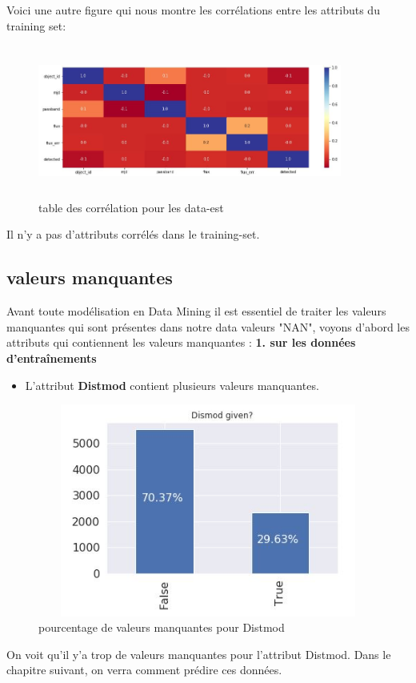 \newline Voici une autre figure qui nous montre les corrélations entre les attributs du training set:
\begin{figure}[!h]
    \centering
    \includegraphics[width=10cm,height=5cm]{report/figures/correlation1.jpg}
    \caption{table des corrélation pour les data-est}
    \label{fig:my_label}
\end{figure}
Il n'y a pas d'attributs corrélés dans le training-set.



\newpage
\subsection{valeurs manquantes}
Avant toute modélisation en Data Mining il est essentiel de traiter les valeurs manquantes qui sont présentes dans notre data valeurs "NAN", voyons d'abord les attributs qui contiennent les valeurs manquantes :
\newline
\textbf{1. sur les données d'entraînements}
\newline
\begin{itemize}
    \item L'attribut \textbf{Distmod} contient plusieurs valeurs manquantes. 
\end{itemize}

\begin{figure}[!h]
    \centering
    \includegraphics[width=12cm,height=7cm]{report/figures/distmod.jpg}
    \caption{pourcentage de valeurs manquantes pour Distmod}
    \label{fig:my_label}
\end{figure}
On voit qu'il y'a trop de valeurs manquantes pour l'attribut Distmod. Dans le chapitre suivant, on verra comment prédire ces données. 
\newline

